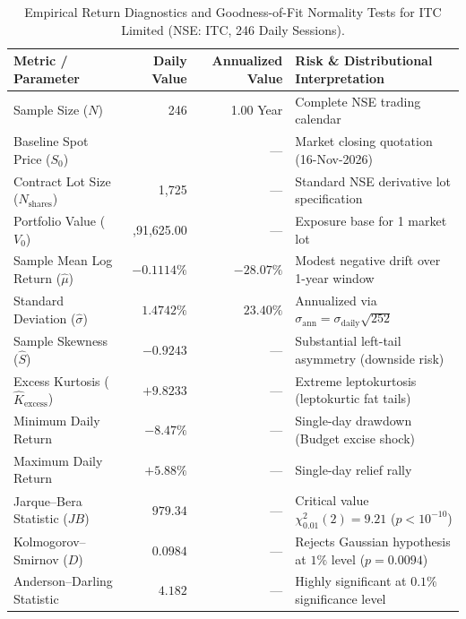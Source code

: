 \begin{table}[!htbp]
    \centering
    \small
    \caption{Empirical Return Diagnostics and Goodness-of-Fit Normality Tests for ITC Limited (NSE: ITC, 246 Daily Sessions).}
    \label{tab:return_diagnostics}
    \vspace{0.2em}
    \renewcommand{\arraystretch}{1.08}
    \begin{tabularx}{\textwidth}{l r r >{\raggedright\arraybackslash}X}
        \toprule
        \textbf{Metric / Parameter} & \textbf{Daily Value} & \textbf{Annualized Value} & \textbf{Risk \& Distributional Interpretation} \\
        \midrule
        Sample Size ($N$) & 246 & 1.00 Year & Complete NSE trading calendar \\
        Baseline Spot Price ($S_0$) & \inr 285.00 & --- & Market closing quotation (16-Nov-2026) \\
        Contract Lot Size ($N_{\text{shares}}$) & 1,725 & --- & Standard NSE derivative lot specification \\
        Portfolio Value ($V_0$) & \inr 4,91,625.00 & --- & Exposure base for 1 market lot \\
        \midrule
        Sample Mean Log Return ($\hat{\mu}$) & $-0.1114\%$ & $-28.07\%$ & Modest negative drift over 1-year window \\
        Standard Deviation ($\hat{\sigma}$) & $1.4742\%$ & $23.40\%$ & Annualized via $\sigma_{\text{ann}} = \sigma_{\text{daily}} \sqrt{252}$ \\
        Sample Skewness ($\hat{S}$) & $-0.9243$ & --- & Substantial left-tail asymmetry (downside risk) \\
        Excess Kurtosis ($\hat{K}_{\text{excess}}$) & $+9.8233$ & --- & Extreme leptokurtosis (leptokurtic fat tails) \\
        Minimum Daily Return & $-8.47\%$ & --- & Single-day drawdown (Budget excise shock) \\
        Maximum Daily Return & $+5.88\%$ & --- & Single-day relief rally \\
        \midrule
        Jarque--Bera Statistic ($JB$) & $979.34$ & --- & Critical value $\chi^2_{0.01}(2) = 9.21$ ($p < 10^{-10}$) \\
        Kolmogorov--Smirnov ($D$) & $0.0984$ & --- & Rejects Gaussian hypothesis at $1\%$ level ($p = 0.0094$) \\
        Anderson--Darling Statistic & $4.182$ & --- & Highly significant at $0.1\%$ significance level \\
        \bottomrule
    \end{tabularx}
\end{table}

